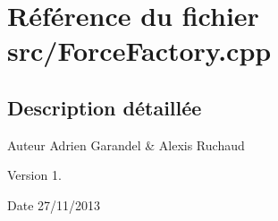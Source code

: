 \section{Référence du fichier src/\-Force\-Factory.cpp}
\label{_force_factory_8cpp}


\subsection{Description détaillée}
\begin{DoxyAuthor}{Auteur}
Adrien Garandel \& Alexis Ruchaud 
\end{DoxyAuthor}
\begin{DoxyVersion}{Version}
1. 
\end{DoxyVersion}
\begin{DoxyDate}{Date}
27/11/2013 
\end{DoxyDate}

